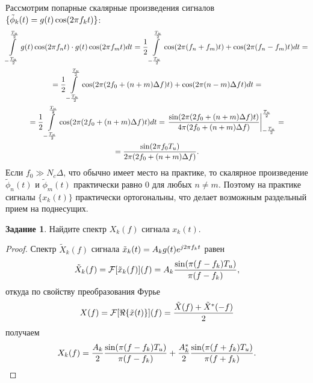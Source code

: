 \documentclass{book}
\numberwithin{theorem}{chapter}
\numberwithin{statement}{chapter}
\numberwithin{lemma}{chapter}
\theoremstyle{definition}
\newtheorem{task}{Задание}
\numberwithin{task}{chapter}
\theoremstyle{remark}
\numberwithin{example}{chapter}
\theoremstyle{definition}
\numberwithin{definition}{chapter}
\theoremstyle{remark}
\theoremstyle{remark}
\numberwithin{lyrics}{section}
\begin{document}
Рассмотрим попарные скалярные произведения сигналов $\{\tilde{\phi}_k(t) = g(t) \cos(2\pi f_k t)\}$:
\begin{equation}
\begin{gathered}
\int\limits_{-\frac{T_u}{2}}^{\frac{T_u}{2}} g(t) \cos(2\pi f_n t) \cdot g(t) \cos(2\pi f_m t) dt = 
\frac{1}{2} \int\limits_{-\frac{T_u}{2}}^{\frac{T_u}{2}} \cos(2\pi (f_n + f_m) t) + \cos(2\pi (f_n - f_m) t) dt = \\
= \frac{1}{2} \int\limits_{-\frac{T_u}{2}}^{\frac{T_u}{2}} \cos(2\pi (2 f_0 + (n + m) \Delta f) t) + \cos(2\pi (n - m) \Delta f t) dt = \\
= \frac{1}{2} \int\limits_{-\frac{T_u}{2}}^{\frac{T_u}{2}} \cos(2\pi (2 f_0 + (n + m) \Delta f) t) dt
= \left. \frac{\sin(2\pi (2 f_0 + (n + m) \Delta f) t)}{4\pi (2 f_0 + (n + m) \Delta f)}  \right|_{-\frac{T_u}{2}}^{\frac{T_u}{2}} = \\ 
= \frac{\sin(2\pi f_0 T_u)}{2\pi (2 f_0 + (n + m) \Delta f)}.
\end{gathered}
\end{equation}
Если $f_0 \gg N_c \Delta$, что обычно имеет место на практике, то скалярное произведение $\tilde{\phi}_n(t)$ и $\tilde{\phi}_m(t)$ практически равно 0 для любых $n \neq m$. Поэтому на практике сигналы $\{x_k(t)\}$ практически ортогональны, что делает возможным раздельный прием на поднесущих.

\begin{task} Найдите спектр $X_k(f)$ сигнала $x_{k}(t)$.
	\label{task:phy:ofdm:spectrum}
\end{task}
\begin{proof}
	Спектр $\tilde{X}_k(f)$ сигнала $\tilde{x}_k(t) = A_k g(t) e^{j2\pi f_k t}$ равен
	\begin{equation}
	\notag
	\label{phy:ofdm:fourier_complex_signal}
	\tilde{X}_{k}(f) = \mathcal{F}[\tilde{x}_k(f)](f) = A_k \frac{\sin(\pi (f - f_k)T_u)}{\pi (f - f_k)},
	\end{equation}
	откуда по свойству преобразования Фурье
	\begin{equation}
	\notag
	X(f) = \mathcal{F}[\Re\{\tilde{x}(t)\}](f) = \frac{\tilde{X}(f) + \tilde{X}^*(-f)}{2}
	\end{equation}
	получаем
	\begin{equation}
	\notag
	X_k(f) = \frac{A_k}{2} \frac{\sin(\pi (f - f_k)T_u)}{\pi (f - f_k)}  + 
	\frac{A_k^*}{2} \frac{\sin(\pi (f + f_k)T_u)}{\pi (f + f_k)}.
	\end{equation}
\end{proof}
\end{document}
